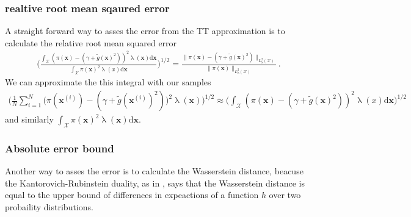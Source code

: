 \subsubsection{realtive root mean sqaured error}
A straight forward way to asses the error from the TT approximation is to calculate the relative root mean squared error
\begin{align}
	\Bigg( \frac{ \int_{\mathcal{X}} (\pi(\bm{x}) - (\gamma + \tilde{g}(\bm{x})^2))^2 \uplambda(\bm{x}) \text{d} \bm{x}}{ \int_{\mathcal{X}} \pi(\bm{x})^2 \uplambda(x)  \text{d} \bm{x} } \Bigg)^{1/2} =	\frac{\lVert 	\pi(\bm{x}) - (\gamma + \tilde{g}(\bm{x})^2)  \rVert_{L^2_{\uplambda}(\mathcal{X})}}{\lVert 	\pi(\bm{x}) \rVert_{L^2_{\uplambda}(\mathcal{X})}  } \, .
\end{align}
We can approximate the this integral with our samples 
\begin{align}
	\Bigg( \frac{1}{N} \sum^{N}_{i =1} \big(\pi(\bm{x}^{(i)}) - (\gamma + \tilde{g}(\bm{x}^{(i)})^2)\big)^2 \uplambda(\bm{x})\Bigg)^{1/2}    \approx \Bigg(  \int_{\mathcal{X}} (\pi(\bm{x}) - (\gamma + \tilde{g}(\bm{x})^2))^2 \uplambda(x) \text{d} \bm{x} \Bigg)^{1/2} 
\end{align}
and similarly $\int_{\mathcal{X}} \pi(\bm{x})^2 \uplambda(\bm{x})  \text{d} \bm{x}$.


\subsubsection{Absolute error bound}
Another way to asses the error is to calculate the Wasserstein distance, beacuse the Kantorovich-Rubinstein duality, as in \cite{thickstun2019kantorovich, Ambrosio2024Kanta}, says that the Wasserstein distance is equal to the upper bound of differences in expeactions of a function $h$ over two probaility distributions.

